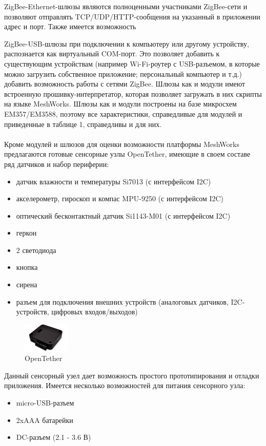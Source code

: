 \documentclass[12pt]{article}
\begin{document}
ZigBee-Ethernet-шлюзы являются полноценными участниками ZigBee-сети и позволяют 
отправлять TCP/UDP/HTTP-сообщения на указанный в приложении адрес и порт. Также
имеется возможность

ZigBee-USB-шлюзы при подключении к компьютеру или другому устройству, распознается
как виртуальный COM-порт. Это позволяет добавить к существующим устройствам 
(например Wi-Fi-роутер с USB-разъемом, в которые можно загрузить собственное приложение;
персональный компьютер и т.д.) добавить возможность работы с сетями ZigBee. Шлюзы
как и модули имеют встроенную прошивку-интерпретатор, которая позволяет загружать
в них скрипты на языке MeshWorks. Шлюзы как и модули построены на базе микросхем
EM357/EM3588, поэтому все характеристики, справедливые для модулей и приведенные
в таблице 1, справедливы и для них.
\\\\
Кроме модулей и шлюзов для оценки возможности платформы MeshWorks предлагаются 
готовые сенсорные узлы OpenTether, имеющие в своем составе ряд датчиков и набор периферии:
\begin{itemize}
    \item датчик влажности и температуры Si7013 (с интерфейсом I2C)
    \item акселерометр, гироскоп и компас MPU-9250 (с интерфейсом I2C)
    \item оптический бесконтактный датчик Si1143-M01 (с интерфейсом I2C)
    \item геркон
    \item 2 светодиода
    \item кнопка
    \item сирена
    \item разъем для подключения внешних устройств (аналоговых датчиков, I2C-устройств,
    цифровых входов/выходов)
\end{itemize}

\begin{figure}
  \begin{center}
    \includegraphics[width=0.20\textwidth]{sensor_node.png}
  \end{center}
  \caption{OpenTether}
\end{figure}

Данный сенсорный узел дает возможность простого прототипирования и отладки приложения.
Имеется несколько возможностей для питания сенсорного узла:
\begin{itemize}
 \item micro-USB-разъем
 \item 2xAAA батарейки
 \item DC-разъем (2.1 - 3.6 В)
\end{itemize}
\end{document}
